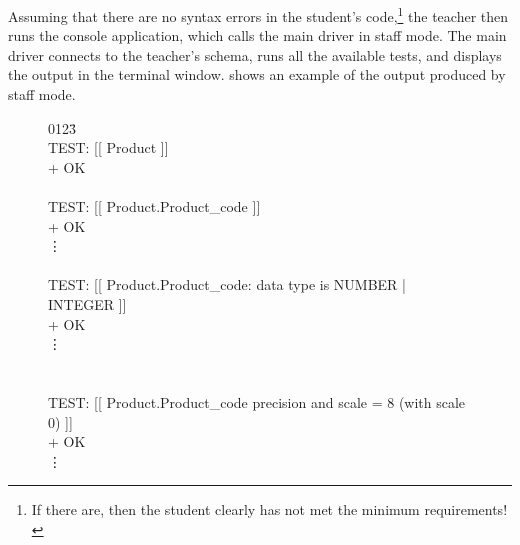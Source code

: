 \documentclass[sigconf, authordraft, capitalise]{acmart}
\begin{document}
Assuming that there are no syntax errors in the student's code,\footnote{If there are, then the student clearly has not met the minimum requirements!} the teacher then runs the console application, which calls the main driver in staff mode. The main driver connects to the teacher's schema, runs all the available tests, and displays the output in the terminal window.  shows an example of the output produced by staff mode.


\newlength{\dothskip}
\setlength{\dothskip}{0.72cm}
\newlength{\dotvskip}
\setlength{\dotvskip}{-1.25ex}
\newlength{\codeskip}
\setlength{\codeskip}{-0.5ex}

\begin{figure}
    \ttfamily\scriptsize
    \begin{tabbing}
        0123\=\kill
         \\[\codeskip]
        TEST: [[ Product ]]  \\
        \>  \textcolor{test green}{+ OK} \\
         \\[\codeskip]
        TEST: [[ Product.Product\_code ]]  \\
        \>  \textcolor{test green}{+ OK} \\[\dotvskip]
        \hspace*{\dothskip}\vdots \\
         \\[\codeskip]
        TEST: [[ Product.Product\_code: data type is NUMBER | INTEGER ]]  \\
        \>  \textcolor{test green}{+ OK} \\[\dotvskip]
        \hspace*{\dothskip}\vdots \\
        \\[\codeskip]
         \\[\codeskip]
        TEST: [[ Product.Product\_code precision and scale = 8 (with scale 0) ]]  \\
        \>  \textcolor{test green}{+ OK} \\[\dotvskip]
        \hspace*{\dothskip}\vdots \\

\end{tabbing}
\end{figure}
\end{document}
